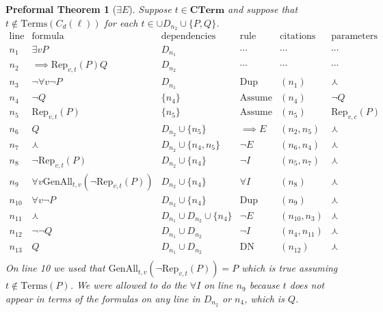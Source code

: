 \documentclass[oneside, 12pt]{book}
\theoremstyle{break}
\newtheorem{preformal definition}[definition]{Preformal Definition}
\newtheorem{preformal theorem}[theorem]{Preformal Theorem}
\newcommand{\bv}[1]{\boldsymbol{#1}}
\begin{document}
		\begin{preformal theorem}[$\exists E$]
			Suppose $t \in \textbf{CTerm}$ and suppose that $t \not \in \text{Terms}(C_d(\bv{\ell}))$ for each $t\in \cup D_{n_2} \cup \{P, Q\}$.
			\begin{equation*}
				\begin{array}{c|c|c|c|c|c}
					\text{line} & \text{formula} & \text{dependencies} & \text{rule} & \text{citations} & \text{parameters}\\ \hline
					n_1 & \exists v P & D_{n_1} & \cdots & \cdots & \cdots\\
					n_2 & \implies \text{Rep}_{v, t}(P) Q & D_{n_2} & \cdots & \cdots & \cdots\\
					n_3 & \lnot \forall v \lnot P & D_{n_1} & \text{Dup} & (n_1) & \curlywedge\\
					n_4 & \lnot Q & \{n_4\} & \text{Assume} & (n_4) & \lnot Q\\
					n_5 & \text{Rep}_{v, t}(P) & \{n_5\} & \text{Assume} & (n_5) & \text{Rep}_{v, c}(P)\\
					n_6 & Q & D_{n_2} \cup \{n_5\} & \implies E & (n_2, n_5) & \curlywedge \\
					n_7 & \curlywedge & D_{n_2} \cup \{n_4, n_5\} & \lnot E & (n_6, n_4) & \curlywedge\\
					n_8 & \lnot \text{Rep}_{v, t}(P) & D_{n_2} \cup \{n_4\} & \lnot I & (n_5, n_7) & \curlywedge\\
					n_9 & \forall v \text{GenAll}_{t, v}(\lnot \text{Rep}_{v, t}(P)) & D_{n_2} \cup \{n_4\} & \forall I & (n_8) & \curlywedge\\
					n_{10} & \forall v \lnot P & D_{n_2} \cup \{n_4\} & \text{Dup} & (n_9) & \curlywedge\\
					n_{11} & \curlywedge & D_{n_1} \cup D_{n_2} \cup \{n_4\} & \lnot E & (n_{10}, n_3) & \curlywedge\\
					n_{12} & \lnot \lnot Q & D_{n_1} \cup D_{n_2} & \lnot I & (n_4, n_{11}) & \curlywedge\\
					n_{13} & Q & D_{n_1} \cup D_{n_2} & \text{DN} & (n_{12}) & \curlywedge\\
				\end{array}
			\end{equation*}
			On line 10 we used that $\text{GenAll}_{t, v}(\lnot \text{Rep}_{v, t}(P)) = P$ which is true assuming $t\not \in \text{Terms}(P)$.
			We were allowed to do the $\forall I$ on line $n_9$ because $t$ does not appear in terms of the formulas on any line in $D_{n_2}$ or $n_4$, which is $Q$. 
			

\end{preformal theorem}
\end{document}
